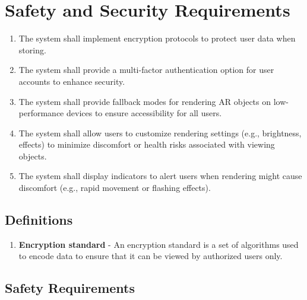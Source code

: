 \documentclass{article}
\begin{document}
\pagebreak

\section{Safety and Security Requirements}


\begin{enumerate}[label=\textbf{SR-\arabic*},ref=SR-\arabic*]
    \item \label{SR-5} The system shall implement encryption protocols to protect user data when storing.
    \item \label{SR-6} The system shall provide a multi-factor authentication option for user accounts to enhance security.
    \item \label{SR-7} The system shall provide fallback modes for rendering AR objects on low-performance devices to ensure accessibility for all users.
    \item \label{SR-8} The system shall allow users to customize rendering settings (e.g., brightness, effects) to minimize discomfort or health risks associated with viewing objects.
    \item \label{SR-9} The system shall display indicators to alert users when rendering might cause discomfort (e.g., rapid movement or flashing effects).

\end{enumerate}
\subsection{Definitions}

\begin{enumerate}
    \item \label{encryption standard} \textbf{Encryption standard} - An encryption standard is a set of algorithms used to encode data to ensure that it can be viewed by authorized users only.
\end{enumerate}

\subsection{Safety Requirements}
\end{document}
